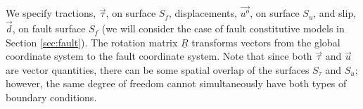 We specify tractions, $\vec{\tau}$, on surface $S_{f}$, displacements,
$\vec{u^{o}}$, on surface $S_{u}$, and slip, $\vec{d}$,
on fault surface $S_{f}$ (we will consider the case of fault constitutive
models in Section \vref{sec:fault}). The rotation matrix $\underline{R}$
transforms vectors from the global coordinate system to the fault
coordinate system. Note that since both $\vec{\tau}$ and
$\vec{u}$ are vector quantities, there can be some spatial
overlap of the surfaces $S_{\tau}$ and $S_{u}$; however, the same degree
of freedom cannot simultaneously have both types of boundary conditions.
